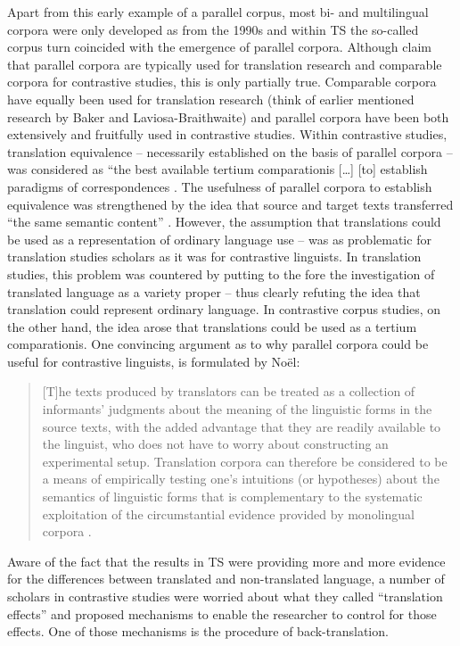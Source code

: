 Apart from this early example of a parallel corpus, most bi- and multilingual corpora were only developed as from the 1990s \citep[19]{mcenery_corpus_2012} and within TS the so-called corpus turn coincided with the emergence of parallel corpora. Although \citet[20]{mcenery_corpus_2012} claim that parallel corpora are typically used for translation research and comparable corpora for contrastive studies, this is only partially true. Comparable corpora have equally been used for translation research (think of earlier mentioned research by Baker and Laviosa-Braithwaite) and parallel corpora have been both extensively and fruitfully used in contrastive studies. Within contrastive studies, translation equivalence – necessarily established on the basis of parallel corpora – was considered as “the best available tertium comparationis […] [to] establish paradigms of correspondences \citep[5]{johansson_role_1998}. The usefulness of parallel corpora to establish equivalence was strengthened by the idea that source and target texts transferred “the same semantic content” \citep[19]{granger_corpus_2003}. However, the assumption that translations could be used as a representation of ordinary language use – was as problematic for translation studies scholars as it was for contrastive linguists. In translation studies, this problem was countered by putting to the fore the investigation of translated language as a variety proper – thus clearly refuting the idea that translation could represent ordinary language. In contrastive corpus studies, on the other hand, the idea arose that translations could be used as a tertium comparationis. One convincing argument as to why parallel corpora could be useful for contrastive linguists, is formulated by Noël:

\begin{quote}
[T]he texts produced by translators can be treated as a collection of informants’ judgments about the meaning of the linguistic forms in the source texts, with the added advantage that they are readily available to the linguist, who does not have to worry about constructing an experimental setup. Translation corpora can therefore be considered to be a means of empirically testing one’s intuitions (or hypotheses) about the semantics of linguistic forms that is complementary to the systematic exploitation of the circumstantial evidence provided by monolingual corpora \citep[759]{noel_translations_2003}.
\end{quote}

Aware of the fact that the results in TS were providing more and more evidence for the differences between translated and non-translated language, a number of scholars in contrastive studies were worried about what they called “translation effects” \citep[6]{johansson_role_1998} and proposed mechanisms to enable the researcher to control for those effects. One of those mechanisms is the procedure of back-translation.


